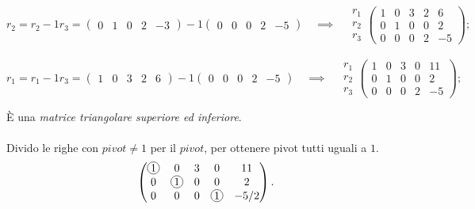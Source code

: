 \documentclass[a4paper]{report}
\newcommand*\circled[1]{
        \tikz[baseline=(char.base)]{
                \node[shape=circle,draw,inner sep=1pt] (char) {#1};
        }
}
\begin{document}
        \paragraph{}
        $
                r_2 = r_2 - 1 r_3 = \begin{pmatrix}0 & 1 & 0 & 2 & -3\end{pmatrix} - 1 \begin{pmatrix}0 & 0 & 0 & 2 & -5\end{pmatrix}
                \quad \implies \quad
                \begin{matrix}r_1 \\ r_2 \\ r_3\end{matrix}
                \begin{pmatrix}
                        1 & 0 & 3 & 2  &  6 \\
                        0 & 1 & 0 & 0  &  2 \\
                        0 & 0 & 0 & 2  & -5
                \end{pmatrix};
        $

        \paragraph{}
        $
                r_1 = r_1 - 1 r_3 = \begin{pmatrix}1 & 0 & 3 & 2 & 6\end{pmatrix} - 1 \begin{pmatrix}0 & 0 & 0 & 2 & -5\end{pmatrix}
                \quad \implies \quad
                \begin{matrix}r_1 \\ r_2 \\ r_3\end{matrix}
                \begin{pmatrix}
                        1 & 0 & 3 & 0  & 11 \\
                        0 & 1 & 0 & 0  &  2 \\
                        0 & 0 & 0 & 2  & -5
                \end{pmatrix};
        $

        \`{E} una \emph{matrice triangolare superiore ed inferiore}.

        \paragraph{}
        Divido le righe con $pivot \neq 1$ per il $pivot$, per ottenere pivot tutti uguali a $1$.
        \[
                \begin{pmatrix}
                        \circled{1} & 0 & 3 & 0  & 11 \\
                        0 & \circled{1} & 0 & 0  &  2 \\
                        0 & 0 & 0 & \circled{1}  & -5/2
                \end{pmatrix}.
        \]
\end{document}
